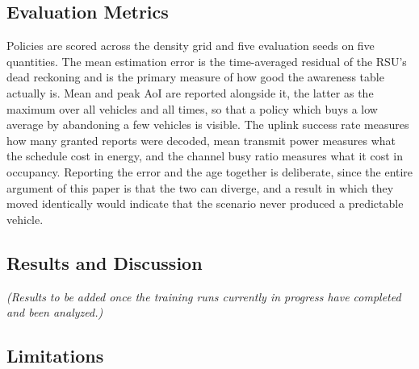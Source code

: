 \documentclass[journal]{IEEEtran}
\begin{document}
\subsection{Evaluation Metrics}
Policies are scored across the density grid and five evaluation seeds on five quantities. The mean estimation error is the time-averaged residual of the RSU's dead reckoning and is the primary measure of how good the awareness table actually is. Mean and peak AoI are reported alongside it, the latter as the maximum over all vehicles and all times, so that a policy which buys a low average by abandoning a few vehicles is visible. The uplink success rate measures how many granted reports were decoded, mean transmit power measures what the schedule cost in energy, and the channel busy ratio measures what it cost in occupancy. Reporting the error and the age together is deliberate, since the entire argument of this paper is that the two can diverge, and a result in which they moved identically would indicate that the scenario never produced a predictable vehicle.

\subsection{Results and Discussion}

\textit{(Results to be added once the training runs currently in progress have completed and been analyzed.)}

\subsection{Limitations}
\end{document}
